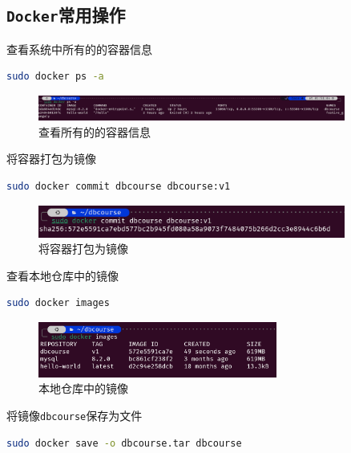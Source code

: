 \documentclass{article}
\begin{document}
\subsection{\texttt{Docker}常用操作}

查看系统中所有的的容器信息

\begin{lstlisting}[language=bash]
sudo docker ps -a
\end{lstlisting}

\begin{figure}[H]
\centering
\includegraphics[width=0.9\textwidth]{img/26.png}
\caption{查看所有的的容器信息}
\end{figure}

将容器打包为镜像

\begin{lstlisting}[language=bash]
sudo docker commit dbcourse dbcourse:v1
\end{lstlisting}

\begin{figure}[H]
\centering
\includegraphics[width=0.9\textwidth]{img/27.png}
\caption{将容器打包为镜像}
\end{figure}

查看本地仓库中的镜像

\begin{lstlisting}[language=bash]
sudo docker images
\end{lstlisting}

\begin{figure}[H]
\centering
\includegraphics[width=0.7\textwidth]{img/28.png}
\caption{本地仓库中的镜像}
\end{figure}

将镜像\texttt{dbcourse}保存为文件

\begin{lstlisting}[language=bash]
sudo docker save -o dbcourse.tar dbcourse
\end{lstlisting}
\end{document}

